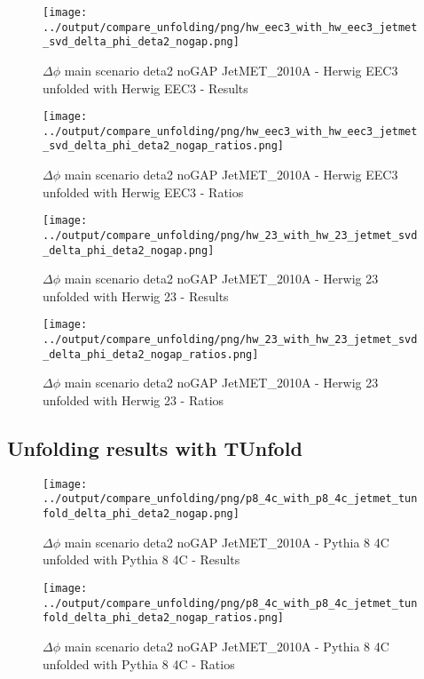 \documentclass[11pt]{book}
\begin{document}
\begin{figure}[ht]
\centering
\texttt{[image: ../output/compare\_unfolding/png/hw\_eec3\_with\_hw\_eec3\_jetmet\_svd\_delta\_phi\_deta2\_nogap.png]}
\caption{$\Delta\phi$ main scenario deta2 noGAP JetMET\_2010A - Herwig EEC3 unfolded with Herwig EEC3 - Results}
\label{hw_eec3_hw_eec3_jetmet_svd_delta_phi_deta2_nogap_a}
\end{figure}

\begin{figure}[ht]
\centering
\texttt{[image: ../output/compare\_unfolding/png/hw\_eec3\_with\_hw\_eec3\_jetmet\_svd\_delta\_phi\_deta2\_nogap\_ratios.png]}
\caption{$\Delta\phi$ main scenario deta2 noGAP JetMET\_2010A - Herwig EEC3 unfolded with Herwig EEC3 - Ratios}
\label{hw_eec3_hw_eec3_jetmet_svd_delta_phi_deta2_nogap_b}
\end{figure}

\begin{figure}[ht]
\centering
\texttt{[image: ../output/compare\_unfolding/png/hw\_23\_with\_hw\_23\_jetmet\_svd\_delta\_phi\_deta2\_nogap.png]}
\caption{$\Delta\phi$ main scenario deta2 noGAP JetMET\_2010A - Herwig 23 unfolded with Herwig 23 - Results}
\label{hw_23_hw_23_jetmet_svd_delta_phi_deta2_nogap_a}
\end{figure}

\begin{figure}[ht]
\centering
\texttt{[image: ../output/compare\_unfolding/png/hw\_23\_with\_hw\_23\_jetmet\_svd\_delta\_phi\_deta2\_nogap\_ratios.png]}
\caption{$\Delta\phi$ main scenario deta2 noGAP JetMET\_2010A - Herwig 23 unfolded with Herwig 23 - Ratios}
\label{hw_23_hw_23_jetmet_svd_delta_phi_deta2_nogap_b}
\end{figure}


\clearpage
\subsection{Unfolding results with TUnfold}

\begin{figure}[ht]
\centering
\texttt{[image: ../output/compare\_unfolding/png/p8\_4c\_with\_p8\_4c\_jetmet\_tunfold\_delta\_phi\_deta2\_nogap.png]}
\caption{$\Delta\phi$ main scenario deta2 noGAP JetMET\_2010A - Pythia 8 4C unfolded with Pythia 8 4C - Results}
\label{p8_p8_jetmet_tunfold_delta_phi_deta2_nogap_a}
\end{figure}

\begin{figure}[ht]
\centering
\texttt{[image: ../output/compare\_unfolding/png/p8\_4c\_with\_p8\_4c\_jetmet\_tunfold\_delta\_phi\_deta2\_nogap\_ratios.png]}
\caption{$\Delta\phi$ main scenario deta2 noGAP JetMET\_2010A - Pythia 8 4C unfolded with Pythia 8 4C - Ratios}
\label{p8_p8_jetmet_tunfold_delta_phi_deta2_nogap_b}
\end{figure}
\end{document}
